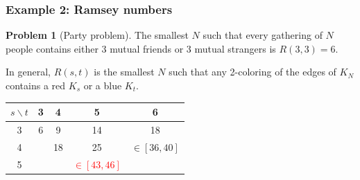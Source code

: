 \documentclass{beamer}
\theoremstyle{definition}
\newtheorem{prob}[thm]{Problem}
\newcommand\remph[1]{\emph{\textcolor{red}{#1}}}
\begin{document}

\begin{frame}
  \frametitle{Example 2: Ramsey numbers}
  \begin{prob}[Party problem]
    The smallest \( N \) such that every gathering of \( N \) people
    contains either 3 mutual friends or 3 mutual strangers is
    \( R(3,3) = 6 \).
  \end{prob}
  \pause
  \vspace{.3cm}

  In general, \( R(s,t) \) is the smallest \( N \) such that any 2-coloring
  of the edges of \( K_N \) contains a red \( K_s \) or a blue \( K_t \).
  \pause
  \vspace{.3cm}

  \begin{center}
  \footnotesize
  \begin{tabular}{c|cccc}
    \( s \backslash t \) & 3 & 4 & 5 & 6 \\
    \hline
    3 & 6 & 9 & 14 & 18 \\
    4 &   & 18 & 25 & \( \in [36, 40] \) \\
    5 &   &    & \remph{\( \in [43, 46] \)} & \\
  \end{tabular}
  \end{center}
\end{frame}

\end{document}
